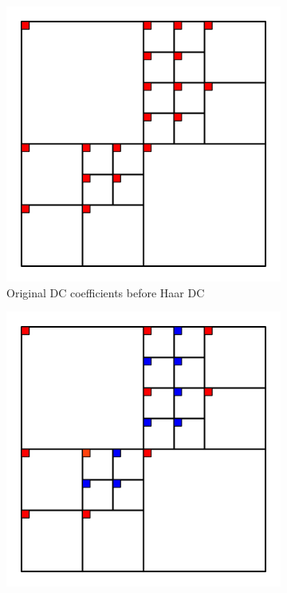 \documentclass[english,conference,10pt]{IEEEtran}
\begin{document}
\begin{figure}
	\centering
	\begin{subfigure}[t]{0.49\columnwidth}
		\includegraphics[width=\columnwidth]{block32_L0}
		\caption{Original DC coefficients before Haar DC}
	\end{subfigure}
	\begin{subfigure}[t]{0.49\columnwidth}
		\includegraphics[width=\columnwidth]{block32_L1}

\end{subfigure}
\end{figure}
\end{document}
